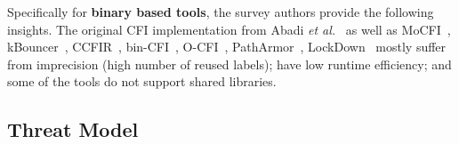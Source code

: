 Specifically for \textbf{binary based tools}, the survey authors provide the following insights. The original CFI implementation 
from Abadi \textit{et al.}~\cite{abadi:cfi2} as well as MoCFI~\cite{mocfi}, 
kBouncer~\cite{kbouncer}, 
CCFIR~\cite{ccfir:zhang}, bin-CFI~\cite{mingwei:sekar}, O-CFI~\cite{mohan:opaque}, 
PathArmor~\cite{veen:cfi}, 
LockDown~\cite{payer:dimva} mostly suffer from imprecision (high number of reused labels); 
have low runtime efficiency; and some of the tools do not support shared libraries.

% 

\subsection{Threat Model}
\label{Adversary Model}

